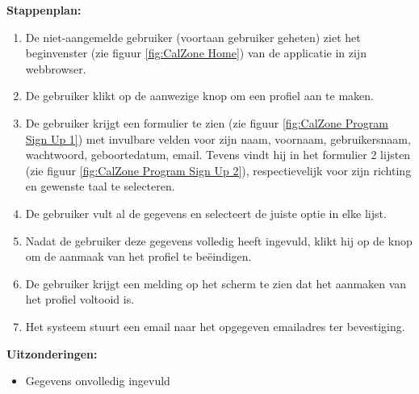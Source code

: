 \textbf{Stappenplan:}
\begin{enumerate}
\item De niet-aangemelde gebruiker (voortaan gebruiker geheten) ziet het beginvenster (zie figuur \ref{fig:CalZone Home}) van de applicatie in zijn webbrowser.
\item De gebruiker klikt op de aanwezige knop om een profiel aan te maken.
\item De gebruiker krijgt een formulier te zien (zie figuur \ref{fig:CalZone Program Sign Up 1}) met invulbare velden voor zijn naam, voornaam, gebruikersnaam, wachtwoord, geboortedatum, email. Tevens vindt hij in het formulier 2 lijsten (zie figuur \ref{fig:CalZone Program Sign Up 2}), respectievelijk voor zijn richting en gewenste taal te selecteren.
\item De gebruiker vult al de gegevens en selecteert de juiste optie in elke lijst.
\item Nadat de gebruiker deze gegevens volledig heeft ingevuld, klikt hij op de knop om de aanmaak van het profiel te beëindigen.
\item De gebruiker krijgt een melding op het scherm te zien dat het aanmaken van het profiel voltooid is.
\item Het systeem stuurt een email naar het opgegeven emailadres ter bevestiging.
\end{enumerate}

\textbf{Uitzonderingen:}
\begin{itemize}
\item Gegevens onvolledig ingevuld
\end{itemize}

